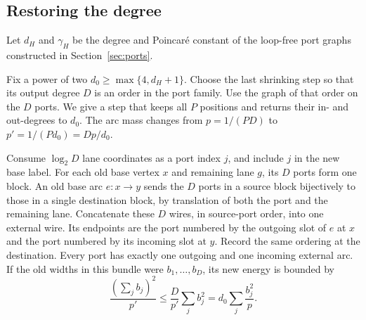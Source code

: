 \subsection{Restoring the degree}\label{subsec:refresh}
Let $d_H$ and $\gamma_H$ be the degree and Poincar\'e constant of the
loop-free port graphs constructed in Section~\ref{sec:ports}.

Fix a power of two $d_0\ge \max\{4,d_H+1\}$.
Choose the last shrinking step so that its output degree $D$ is an order in the port family. Use the graph of that order on the $D$ ports. We give a step that
keeps all $P$ positions and returns their in- and out-degrees to $d_0$.
The arc mass changes from $p=1/(PD)$ to $p'=1/(Pd_0)=Dp/d_0$.

Consume $\log_2 D$ lane coordinates as a port index $j$, and include $j$ in
the new base label. For each old base vertex $x$ and remaining lane $g$, its
$D$ ports form one block. An old base arc $e:x\to y$ sends the $D$ ports in a source
block bijectively to those in a single destination block, by translation of both
the port and the remaining lane. Concatenate these $D$ wires, in source-port order,
into one external wire. Its endpoints are the port numbered by the outgoing slot of
$e$ at $x$ and the port numbered by its incoming slot at $y$. Record the same
ordering at the destination. Every port has exactly one outgoing and one incoming
external arc. If the old widths in this bundle were $b_1,\ldots,b_D$, its new
energy is bounded by
\[
 \frac{(\sum_j b_j)^2}{p'}\le \frac{D}{p'}\sum_j b_j^2
     =d_0\sum_j\frac{b_j^2}{p}.
\]

